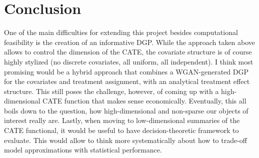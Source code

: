 \documentclass[11pt, a4paper, leqno]{article}
\begin{document}
\section{Conclusion}
One of the main difficulties for extending this project besides computational feasibility is the creation of an informative DGP\@.
While the approach taken above allows to control the dimension of the CATE, the covariate structure is of course highly stylized (no discrete covariates, all uniform, all independent).
I think most promising would be a hybrid approach that combines a WGAN-generated DGP for the covariates and treatment assignment, with an analytical treatment effect structure.
This still poses the challenge, however, of coming up with a high-dimensional CATE function that makes sense economically.
Eventually, this all boils down to the question, how high-dimensional and non-sparse our objects of interest really are.
Lastly, when moving to low-dimensional summaries of the CATE functional, it would be useful to have decision-theoretic framework to evaluate.
This would allow to think more systematically about how to trade-off model approximations with statistical performance.

\clearpage
\newpage

\printbibliography
{}


\end{document}
